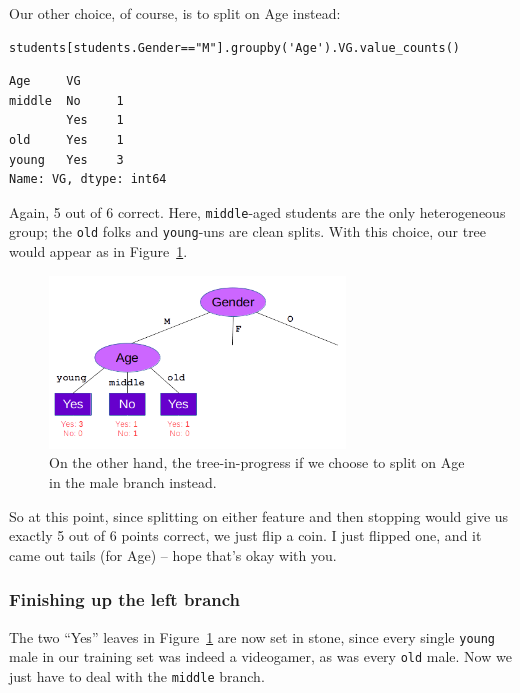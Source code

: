 \begin{samepage}
Our other choice, of course, is to split on \textsf{Age} instead:

\begin{Verbatim}[fontsize=\footnotesize,samepage=true,frame=single,framesep=3mm]
students[students.Gender=="M"].groupby('Age').VG.value_counts()
\end{Verbatim}
\vspace{-.2in}
\end{samepage}

\begin{Verbatim}[fontsize=\small,samepage=true,frame=leftline,framesep=5mm,framerule=1mm]
Age     VG 
middle  No     1
        Yes    1
old     Yes    1
young   Yes    3
Name: VG, dtype: int64
\end{Verbatim}

Again, 5 out of 6 correct. Here, \texttt{middle}-aged students are the only
heterogeneous group; the \texttt{old} folks and \texttt{young}-uns are clean
splits. With this choice, our tree would appear as in
Figure~\ref{fig:maleAgeSplit}.

\begin{figure}[ht]
\centering
\includegraphics[width=0.7\textwidth]{maleAgeSplit.png}
\caption{On the other hand, the tree-in-progress if we choose to split on
\textsf{Age} in the male branch instead.}
\label{fig:maleAgeSplit}
\end{figure}

So at this point, since splitting on either feature and then stopping would
give us exactly 5 out of 6 points correct, we just flip a coin. I just flipped
one, and it came out tails (for \textsf{Age}) -- hope that's okay with you.

\subsubsection{Finishing up the left branch}

The two ``Yes'' leaves in Figure~\ref{fig:maleAgeSplit} are now set in stone,
since every single \texttt{young} male in our training set was indeed a
videogamer, as was every \texttt{old} male. Now we just have to deal with the
\texttt{middle} branch.

